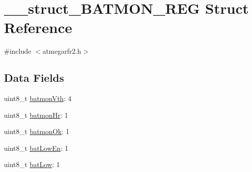 \hypertarget{struct____struct___b_a_t_m_o_n___r_e_g}{\section{\-\_\-\-\_\-struct\-\_\-\-B\-A\-T\-M\-O\-N\-\_\-\-R\-E\-G Struct Reference}
\label{struct____struct___b_a_t_m_o_n___r_e_g}
}


{\ttfamily \#include $<$atmegarfr2.\-h$>$}

\subsection*{Data Fields}
\begin{DoxyCompactItemize}
\item 
uint8\-\_\-t \hyperlink{struct____struct___b_a_t_m_o_n___r_e_g_aee94100d6595309656885edda06efb8d}{batmon\-Vth}\-: 4
\item 
uint8\-\_\-t \hyperlink{struct____struct___b_a_t_m_o_n___r_e_g_a44d077e6d16aa01680d2820befb41029}{batmon\-Hr}\-: 1
\item 
uint8\-\_\-t \hyperlink{struct____struct___b_a_t_m_o_n___r_e_g_acd61ed7c95a087747685ec11866dd04c}{batmon\-Ok}\-: 1
\item 
uint8\-\_\-t \hyperlink{struct____struct___b_a_t_m_o_n___r_e_g_a36cfa310dd32b92e7ab52da781a6cad2}{bat\-Low\-En}\-: 1
\item 
uint8\-\_\-t \hyperlink{struct____struct___b_a_t_m_o_n___r_e_g_a242e90a23debcf34c7c050ad95caa8bd}{bat\-Low}\-: 1
\end{DoxyCompactItemize}


